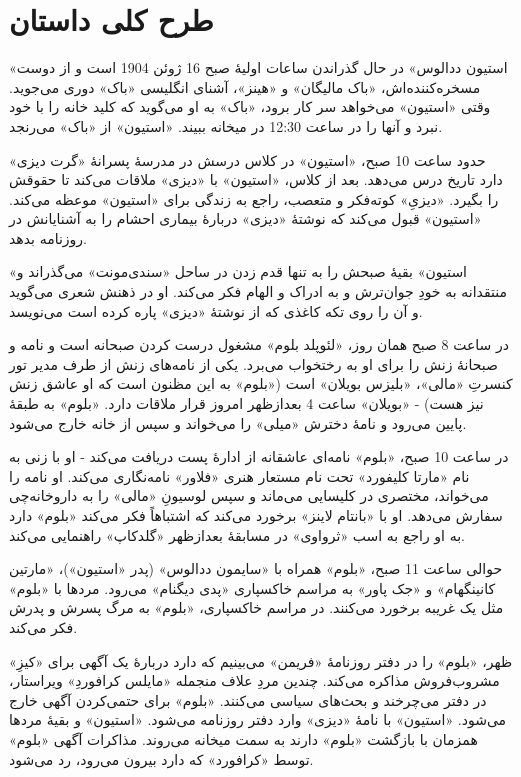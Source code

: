 \documentclass[12pt]{book}
\newcommand{\noun}[1]{«{#1}»}
\begin{document}
    \part{طرح کلی داستان}
    \noun{استیون ددالوس} در حال گذراندن ساعات اولیۀ صبح 16 ژوئن 1904 است و از دوست مسخره‌کننده‌اش، \noun{باک مالیگان} و \noun{هینز}، آشنای انگلیسی \noun{باک} دوری می‌جوید. وقتی \noun{استیون} می‌خواهد سر کار برود، \noun{باک} به او می‌گوید که کلید خانه را با خود نبرد و آنها را در ساعت 12:30 در میخانه ببیند. \noun{استیون} از \noun{باک} می‌رنجد.

    حدود ساعت 10 صبح، \noun{استیون} در کلاس درسش در مدرسۀ پسرانۀ \noun{گرت دیزی} دارد تاریخ درس می‌دهد. بعد از کلاس، \noun{استیون} با \noun{دیزی} ملاقات می‌کند تا حقوقش را بگیرد. \noun{دیزیِ} کوته‌فکر و متعصب، راجع به زندگی برای \noun{استیون} موعظه می‌کند. \noun{استیون} قبول می‌کند که نوشتۀ \noun{دیزی} دربارۀ بیماری احشام را به آشنایانش در روزنامه بدهد.

    \noun{استیون} بقیۀ صبحش را به تنها قدم زدن در ساحل \noun{سندی‌مونت} می‌گذراند و منتقدانه به خودِ جوان‌ترش و به ادراک و الهام فکر می‌کند. او در ذهنش شعری می‌گوید و آن را روی تکه کاغذی که از نوشتۀ \noun{دیزی} پاره کرده است می‌نویسد.

    در ساعت 8 صبح همان روز، \noun{لئوپلد بلوم} مشغول درست کردن صبحانه است و نامه و صبحانۀ زنش را برای او به رختخواب می‌برد. یکی از نامه‌های زنش از طرف مدیر تور کنسرتِ \noun{مالی}، \noun{بلیزس بویلان} است (\noun{بلوم} به این مظنون است که او عاشق زنش نیز هست) - \noun{بویلان} ساعت 4 بعدازظهر امروز قرار ملاقات دارد. \noun{بلوم} به طبقۀ پایین می‌رود و نامۀ دخترش \noun{میلی} را می‌خواند و سپس از خانه خارج می‌شود.

    در ساعت 10 صبح، \noun{بلوم} نامه‌ای عاشقانه از ادارۀ پست دریافت می‌کند - او با زنی به نام \noun{مارتا کلیفورد} تحت نام مستعار هنری \noun{فلاور} نامه‌نگاری می‌کند. او نامه را می‌خواند، مختصری در کلیسایی می‌ماند و سپس لوسیونِ \noun{مالی} را به داروخانه‌چی سفارش می‌دهد. او با \noun{بانتام لاینز} برخورد می‌کند که اشتباهاً فکر می‌کند \noun{بلوم} دارد به او راجع به اسب \noun{ثرواوی} در مسابقۀ بعدازظهر \noun{گلدکاپ} راهنمایی می‌کند.

    حوالی ساعت 11 صبح، \noun{بلوم} همراه با \noun{سایمون ددالوس} (پدر \noun{استیون})، \noun{مارتین کانینگهام} و \noun{جک پاور} به مراسم خاکسپاری \noun{پدی دیگنام} می‌رود. مردها با \noun{بلوم} مثل یک غریبه برخورد می‌کنند. در مراسم خاکسپاری، \noun{بلوم} به مرگ پسرش و پدرش فکر می‌کند.

    ظهر، \noun{بلوم} را در دفتر روزنامۀ \noun{فریمن} می‌بینیم که دارد دربارۀ یک آگهی برای \noun{کیزِ} مشروب‌فروش مذاکره می‌کند. چندین مردِ علاف منجمله \noun{مایلس کرافوردِ} ویراستار، در دفتر می‌چرخند و بحث‌های سیاسی می‌کنند. \noun{بلوم} برای حتمی‌کردن آگهی خارج می‌شود. \noun{استیون} با نامۀ \noun{دیزی} وارد دفتر روزنامه می‌شود. \noun{استیون} و بقیۀ مردها همزمان با بازگشت \noun{بلوم} دارند به سمت میخانه می‌روند. مذاکرات آگهی \noun{بلوم} توسط \noun{کرافورد} که دارد بیرون می‌رود، رد می‌شود.
\end{document}
